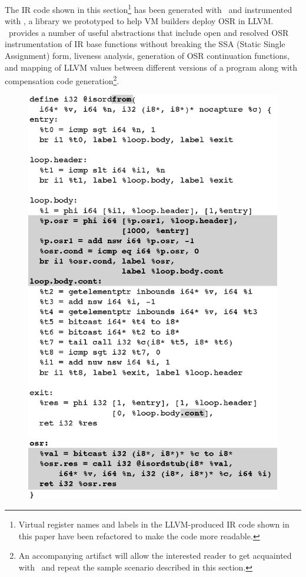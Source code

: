 The IR code shown in this section\footnote{Virtual register names and labels in the LLVM-produced IR code shown in this paper have been refactored to make the code more readable.} has been generated with \clang\ and instrumented with \osrkit, a library we prototyped to help VM builders deploy OSR in LLVM. \osrkit\ provides a number of useful abstractions that include open and resolved OSR instrumentation of IR base functions without breaking the SSA (Static Single Assignment) form, liveness analysis, generation of OSR continuation functions, and mapping of LLVM values between different versions of a program along with compensation code generation\footnote{An accompanying artifact will allow the interested reader to get acquainted with \osrkit\ and repeat the sample scenario described in this section.}.


\ifdefined\noauthorea
\begin{figure}[t]
\begin{center}
\includegraphics[width=0.9\columnwidth]{figures/isordfrom/isordfrom.eps}
\caption{\protect}
\end{center}
\end{figure}
\fi

